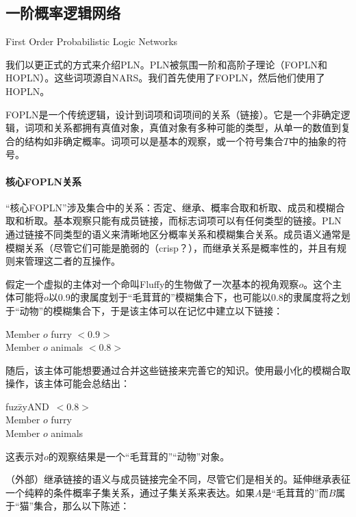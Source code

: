 \subsection{一阶概率逻辑网络}{First Order Probabilistic Logic Networks}

我们以更正式的方式来介绍PLN。PLN被氛围一阶和高阶子理论（FOPLN和HOPLN）。这些词项源自NARS\cite{Wang2006}。我们首先使用了FOPLN，然后他们使用了HOPLN。

FOPLN是一个传统逻辑，设计到词项和词项间的关系（链接）。它是一个非确定逻辑，词项和关系都拥有真值对象，真值对象有多种可能的类型，从单一的数值到复合的结构如非确定概率。词项可以是基本的观察，或一个符号集合$T$中的抽象的符号。

\paragraph{核心FOPLN关系}

“核心FOPLN”涉及集合中的关系：否定、继承、概率合取和析取、成员和模糊合取和析取。基本观察只能有成员链接，而标志词项可以有任何类型的链接。PLN通过链接不同类型的语义来清晰地区分概率关系和模糊集合关系。成员语义通常是模糊关系（尽管它们可能是脆弱的（crisp？），而继承关系是概率性的，并且有规则来管理这二者的互操作。

假定一个虚拟的主体对一个命叫Fluffy的生物做了一次基本的视角观察$o$。这个主体可能将$o$以0.9的隶属度划于“毛茸茸的”模糊集合下，也可能以0.8的隶属度将之划于“动物”的模糊集合下，于是该主体可以在记忆中建立以下链接：

 \begin{tabbing}
\=Member $o$ furry $<0.9>$\\
\>Member $o$ animals $<0.8>$\\
\end{tabbing}

随后，该主体可能想要通过合并这些链接来完善它的知识。使用最小化的模糊合取操作，该主体可能会总结出：

 \begin{tabbing}
fuz\=zyAND\ $<0.8>$\\
\> Member $o$ furry \\
\> Member $o$ animals \\
\end{tabbing}

这表示对$o$的观察结果是一个“毛茸茸的”“动物”对象。

（外部）继承链接的语义与成员链接完全不同，尽管它们是相关的。延伸继承表征一个纯粹的条件概率子集关系，通过子集关系来表达。如果$A$是“毛茸茸的”而$B$属于“猫”集合，那么以下陈述：

